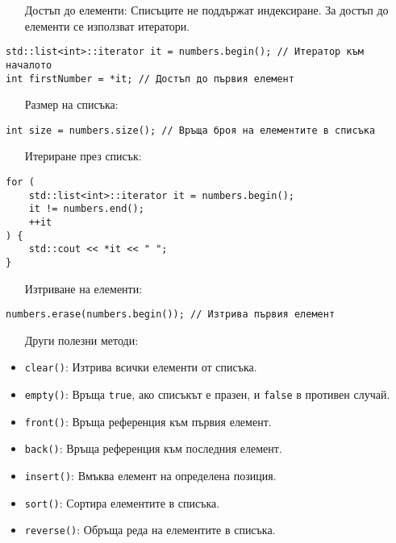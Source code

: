 \documentclass[oneside]{book}
\newcommand*{\code}[1]{\texttt{#1}}
\begin{document}
\begin{itemize}\item[Достъп] до елементи: Списъците не поддържат индексиране. За достъп до елементи се използват итератори.\end{itemize}
\begin{mdframed}\begin{lstlisting}
std::list<int>::iterator it = numbers.begin(); // Итератор към началото
int firstNumber = *it; // Достъп до първия елемент
\end{lstlisting}\end{mdframed}

\begin{itemize}\item[Размер] на списъка:\end{itemize}
\begin{mdframed}\begin{lstlisting}
int size = numbers.size(); // Връща броя на елементите в списъка
\end{lstlisting}\end{mdframed}

\begin{itemize}\item[Итериране] през списък:\end{itemize}
\begin{mdframed}\begin{lstlisting}
for (
    std::list<int>::iterator it = numbers.begin();
    it != numbers.end();
    ++it
) {
    std::cout << *it << " ";
}
\end{lstlisting}\end{mdframed}

\begin{itemize}\item[Изтриване] на елементи:\end{itemize}
\begin{mdframed}\begin{lstlisting}
numbers.erase(numbers.begin()); // Изтрива първия елемент
\end{lstlisting}\end{mdframed}

\begin{itemize}\item[Други] полезни методи:\end{itemize}
\begin{itemize}
    \item \code{clear()}: Изтрива всички елементи от списъка.
    \item \code{empty()}: Връща \code{true}, ако списъкът е празен, и \code{false} в противен случай.
    \item \code{front()}: Връща референция към първия елемент.
    \item \code{back()}: Връща референция към последния елемент.
    \item \code{insert()}: Вмъква елемент на определена позиция.
    \item \code{sort()}: Сортира елементите в списъка.
    \item \code{reverse()}: Обръща реда на елементите в списъка.
\end{itemize}
\end{document}
